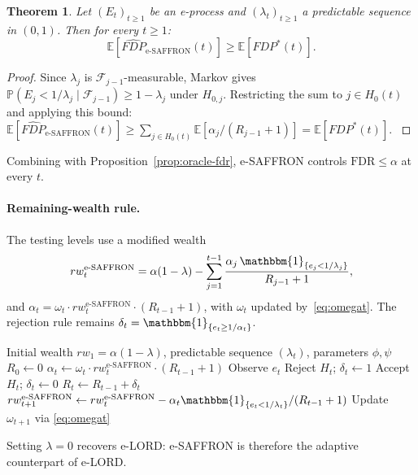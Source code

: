 \documentclass[11pt,a4paper,twocolumn]{article}
\theoremstyle{plain}
\newtheorem{theorem}{Theorem}[section]
\theoremstyle{definition}
\theoremstyle{remark}
\newcommand{\E}{\mathbb{E}}
\newcommand{\Prob}{\mathbb{P}}
\newcommand{\ind}{\mathbbm{1}}
\newcommand{\FDR}{\mathrm{FDR}}
\begin{document}
\begin{theorem}
Let $(E_t)_{t \geq 1}$ be an e-process and $(\lambda_t)_{t \geq 1}$ a
predictable sequence in $(0,1)$. Then for every $t \geq 1$:
\[
  \E[\widehat{FDP}_{\text{e-SAFFRON}}(t)] \geq \E[FDP^*(t)].
\]
\end{theorem}

\begin{proof}{\small
Since $\lambda_j$ is $\mathcal{F}_{j-1}$-measurable, Markov gives
$\Prob(E_j < 1/\lambda_j\mid\mathcal{F}_{j-1})\geq 1-\lambda_j$ under $H_{0,j}$.
Restricting the sum to $j\in H_0(t)$ and applying this bound:
$\E[\widehat{FDP}_{\text{e-SAFFRON}}(t)]
\geq \sum_{j\in H_0(t)}\E[\alpha_j/(R_{j-1}+1)]
= \E[FDP^*(t)]$.
}\end{proof}

Combining with Proposition~\ref{prop:oracle-fdr}, e-SAFFRON controls
$\FDR \leq \alpha$ at every $t$.

\paragraph{Remaining-wealth rule.}
The testing levels use a modified wealth
\[
  rw_t^{\text{e-SAFFRON}} = \alpha(1 - \lambda)
    - \sum_{j=1}^{t-1} \frac{\alpha_j\,\ind_{\{e_j < 1/\lambda_j\}}}{R_{j-1}+1},
\]
and $\alpha_t = \omega_t \cdot rw_t^{\text{e-SAFFRON}} \cdot (R_{t-1}+1)$,
with $\omega_t$ updated by~\eqref{eq:omegat}. The rejection rule remains
$\delta_t = \ind_{\{e_t \geq 1/\alpha_t\}}$.


\begin{algorithm*}
\caption{e-SAFFRON}
\label{alg:esaffron}
\begin{algorithmic}[1]
\Require Initial wealth $rw_1 = \alpha(1 - \lambda)$, predictable sequence $(\lambda_t)$, parameters $\phi, \psi$
\State $R_0 \leftarrow 0$
    \State $\alpha_t \leftarrow \omega_t \cdot rw_t^{\text{e-SAFFRON}} \cdot (R_{t-1}+1)$
    \State Observe $e_t$
        \State Reject $H_t$; $\delta_t \leftarrow 1$
    \Else
        \State Accept $H_t$; $\delta_t \leftarrow 0$
    \EndIf
    \State $R_t \leftarrow R_{t-1} + \delta_t$
    \State $rw_{t+1}^{\text{e-SAFFRON}} \leftarrow rw_t^{\text{e-SAFFRON}} - \alpha_t \ind_{\{e_t < 1/\lambda_t\}}/(R_{t-1}+1)$
    \State Update $\omega_{t+1}$ via \eqref{eq:omegat}
\EndFor
\end{algorithmic}
\end{algorithm*}

Setting $\lambda = 0$ recovers e-LORD: e-SAFFRON is therefore the adaptive
counterpart of e-LORD.
\end{document}
